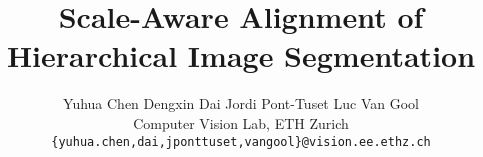 \documentclass[10pt,twocolumn,letterpaper]{article}
\begin{document}
\title{Scale-Aware Alignment of Hierarchical Image Segmentation}

\author{Yuhua Chen \qquad Dengxin Dai \qquad Jordi Pont-Tuset \qquad Luc Van Gool\\
Computer Vision Lab, ETH Zurich\\
{\tt\small \{yuhua.chen,dai,jponttuset,vangool\}@vision.ee.ethz.ch}
}

\maketitle





%




{\small


}
\end{document}
